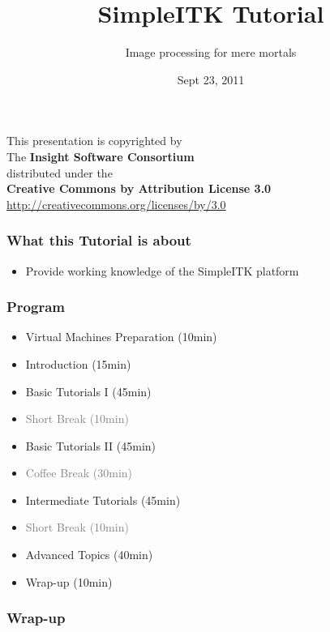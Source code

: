 \documentclass[18pt]{beamer}
\begin{document}
\title[SimpleITK - MICCAI 2011]{SimpleITK Tutorial}
\subtitle[IP for mere mortals]{Image processing for mere mortals}
\date[Sept 2011]{Sept 23, 2011}

\begin{frame}
\titlepage
\end{frame}


{
\begin{frame}[plain]
\center
\begin{center}
This presentation is copyrighted by\\
The \textbf{Insight Software Consortium}\\
\bigskip
distributed under the\\
\textbf{Creative Commons by Attribution License 3.0}\\
\url{http://creativecommons.org/licenses/by/3.0}\\
\end{center}
\end{frame}
}


\begin{frame}
\frametitle{What this Tutorial is about}
\begin{itemize}
\item Provide working knowledge of the SimpleITK platform
\end{itemize}
\end{frame}

\begin{frame}
\frametitle{Program}

\begin{itemize}
\item Virtual Machines Preparation (10min)
\item Introduction (15min)
\item Basic Tutorials I (45min)
\item \textcolor{gray}{Short Break (10min)}
\item Basic Tutorials II (45min)
\item \textcolor{gray}{Coffee Break (30min)}
\item Intermediate Tutorials (45min)
\item \textcolor{gray}{Short Break (10min)}
\item Advanced Topics (40min)
\item Wrap-up (10min)
\end{itemize}

\end{frame}










\begin{frame}
\frametitle{Wrap-up}
\end{frame}
\end{document}
